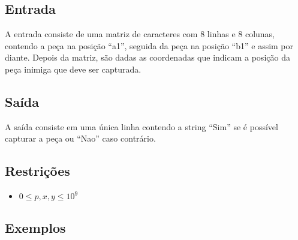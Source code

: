 \subsection*{Entrada}
\textoDiversasInstanciasEOF

A entrada consiste de uma matriz de caracteres com 8 linhas e 8 colunas, contendo a peça na posição ``a1'', seguida da peça na posição ``b1'' e assim por diante. Depois da matriz, são dadas as coordenadas que indicam a posição da peça inimiga que deve ser capturada. \\


\subsection*{Saída}

A saída consiste em uma única linha contendo a string ``Sim'' se é possível capturar a peça ou ``Nao'' caso contrário.


\subsection*{Restrições}
\begin{itemize}
  \item $0 \leq p, x, y \leq 10^9$
\end{itemize}

\subsection*{Exemplos}

